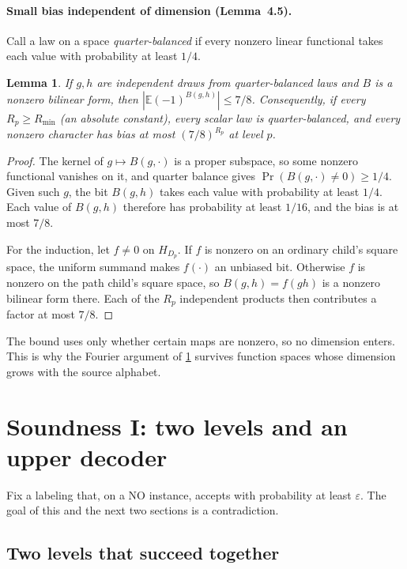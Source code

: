 \documentclass[11pt]{article}
\newtheorem{lemma}[theorem]{Lemma}
\theoremstyle{definition}
\theoremstyle{remark}
\newcommand{\E}{\mathbb E}
\newcommand{\eps}{\varepsilon}
\begin{document}
\paragraph{Small bias independent of dimension (Lemma~4.5).} Call a law on a
space \emph{quarter-balanced} if every nonzero linear functional takes each
value with probability at least $1/4$.

\begin{lemma}\label{lem:bias}
If $g,h$ are independent draws from quarter-balanced laws and $B$ is a nonzero
bilinear form, then $|\E(-1)^{B(g,h)}|\le7/8$. Consequently, if every
$R_p\ge R_{\min}$ (an absolute constant), every scalar law is
quarter-balanced, and every nonzero character has bias at most $(7/8)^{R_p}$
at level $p$.
\end{lemma}

\begin{proof}
The kernel of $g\mapsto B(g,\cdot)$ is a proper subspace, so some nonzero
functional vanishes on it, and quarter balance gives
$\Pr(B(g,\cdot)\neq0)\ge1/4$. Given such $g$, the bit $B(g,h)$ takes each value
with probability at least $1/4$. Each value of $B(g,h)$ therefore has
probability at least $1/16$, and the bias is at most $7/8$.

For the induction, let $f\ne0$ on $H_{D_p}$. If $f$ is nonzero on an ordinary
child's square space, the uniform summand makes $f(\cdot)$ an unbiased bit.
Otherwise $f$ is nonzero on the path child's square space, so $B(g,h)=f(gh)$
is a nonzero bilinear form there. Each of the $R_p$ independent products then
contributes a factor at most $7/8$.
\end{proof}

The bound uses only whether certain maps are nonzero, so no dimension enters.
This is why the Fourier argument of \cref{sec:upper} survives function spaces
whose dimension grows with the source alphabet.

\section{Soundness I: two levels and an upper decoder}\label{sec:upper}

Fix a labeling that, on a NO instance, accepts with probability at least
$\eps$. The goal of this and the next two sections is a contradiction.

\subsection{Two levels that succeed together}
\end{document}

